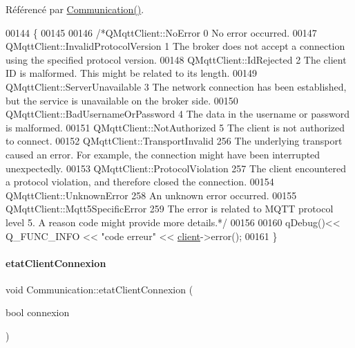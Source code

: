 Référencé par \hyperlink{class_communication_a7376830f5598b7e3c0eb4434a8a8766e}{Communication()}.


\begin{DoxyCode}
00144 \{
00145 
00146         \textcolor{comment}{/*QMqttClient::NoError                0 No error occurred.}
00147 \textcolor{comment}{        QMqttClient::InvalidProtocolVersion 1   The broker does not accept a connection using the specified
       protocol version.}
00148 \textcolor{comment}{        QMqttClient::IdRejected             2   The client ID is malformed. This might be related to its
       length.}
00149 \textcolor{comment}{        QMqttClient::ServerUnavailable      3   The network connection has been established, but the
       service is unavailable on the broker side.}
00150 \textcolor{comment}{        QMqttClient::BadUsernameOrPassword  4   The data in the username or password is malformed.}
00151 \textcolor{comment}{        QMqttClient::NotAuthorized          5   The client is not authorized to connect.}
00152 \textcolor{comment}{        QMqttClient::TransportInvalid       256 The underlying transport caused an error. For example, the
       connection might have been interrupted unexpectedly.}
00153 \textcolor{comment}{        QMqttClient::ProtocolViolation      257 The client encountered a protocol violation, and therefore
       closed the connection.}
00154 \textcolor{comment}{        QMqttClient::UnknownError           258 An unknown error occurred.}
00155 \textcolor{comment}{        QMqttClient::Mqtt5SpecificError     259 The error is related to MQTT protocol level 5. A reason
       code might provide more details.*/}
00156 
00160     qDebug()<< Q\_FUNC\_INFO << \textcolor{stringliteral}{"code erreur"} << \hyperlink{class_communication_a59ae01a54d6c3fde6242c46d802b954b}{client}->error();
00161 \}
\end{DoxyCode}
\mbox{\label{class_communication_aa6100d6b2addece57f3e74c1140a3179}} 
\paragraph{\texorpdfstring{etat\+Client\+Connexion}{etatClientConnexion}}
{\footnotesize\ttfamily void Communication\+::etat\+Client\+Connexion (\begin{DoxyParamCaption}\item[{bool}]{connexion }\end{DoxyParamCaption})\hspace{0.3cm}{\ttfamily [signal]}}




